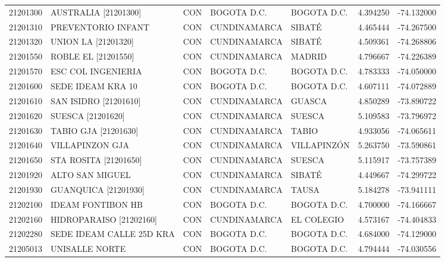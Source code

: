 \begin{longtable}{rllllrr}
 21201300 &        AUSTRALIA [21201300] &  CON &      BOGOTA D.C. &       BOGOTA D.C. &  4.394250 & -74.132000 \\
 21201310 &          PREVENTORIO INFANT &  CON &     CUNDINAMARCA &            SIBATÉ &  4.465444 & -74.267500 \\
 21201320 &         UNION LA [21201320] &  CON &     CUNDINAMARCA &            SIBATÉ &  4.509361 & -74.268806 \\
 21201550 &         ROBLE EL [21201550] &  CON &     CUNDINAMARCA &            MADRID &  4.796667 & -74.226389 \\
 21201570 &          ESC COL INGENIERIA &  CON &      BOGOTA D.C. &       BOGOTA D.C. &  4.783333 & -74.050000 \\
 21201600 &           SEDE IDEAM KRA 10 &  CON &      BOGOTA D.C. &       BOGOTA D.C. &  4.607111 & -74.072889 \\
 21201610 &       SAN ISIDRO [21201610] &  CON &     CUNDINAMARCA &            GUASCA &  4.850289 & -73.890722 \\
 21201620 &        SUESCA    [21201620] &  CON &     CUNDINAMARCA &            SUESCA &  5.109583 & -73.796972 \\
 21201630 &        TABIO GJA [21201630] &  CON &     CUNDINAMARCA &             TABIO &  4.933056 & -74.065611 \\
 21201640 &             VILLAPINZON GJA &  CON &     CUNDINAMARCA &       VILLAPINZÓN &  5.263750 & -73.590861 \\
 21201650 &       STA ROSITA [21201650] &  CON &     CUNDINAMARCA &            SUESCA &  5.115917 & -73.757389 \\
 21201920 &             ALTO SAN MIGUEL &  CON &     CUNDINAMARCA &            SIBATÉ &  4.449667 & -74.299722 \\
 21201930 &        GUANQUICA [21201930] &  CON &     CUNDINAMARCA &             TAUSA &  5.184278 & -73.941111 \\
 21202100 &           IDEAM FONTIBON HB &  CON &      BOGOTA D.C. &       BOGOTA D.C. &  4.700000 & -74.166667 \\
 21202160 &     HIDROPARAISO [21202160] &  CON &     CUNDINAMARCA &        EL COLEGIO &  4.573167 & -74.404833 \\
 21202280 &    SEDE IDEAM CALLE 25D KRA &  CON &      BOGOTA D.C. &       BOGOTA D.C. &  4.684000 & -74.129000 \\
 21205013 &              UNISALLE NORTE &  CON &      BOGOTA D.C. &       BOGOTA D.C. &  4.794444 & -74.030556 \\

\end{longtable}
